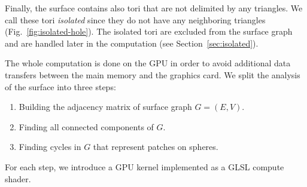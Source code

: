 Finally, the surface contains also tori that are not delimited by any triangles.
We call these tori \textit{isolated} since they do not have any neighboring triangles (Fig.~\ref{fig:isolated-hole}).
The isolated tori are excluded from the surface graph and are handled later in the computation (see Section~\ref{sec:isolated}).


The whole computation is done on the GPU in order to avoid additional data transfers between the main memory and the graphics card.
We split the analysis of the surface into three steps:

\begin{enumerate}
  \item Building the adjacency matrix of surface graph $G = (E, V)$.
	\item Finding all connected components of $G$.
	\item Finding cycles in $G$ that represent patches on spheres.
\end{enumerate}

For each step, we introduce a GPU kernel implemented as a GLSL compute shader.

